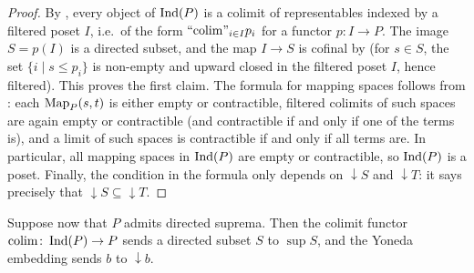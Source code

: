 	\begin{proof}
		By , every object of $\operatorname{Ind}(P)$ is a colimit of representables indexed by a filtered poset $I$, i.e.\ of the form $\text{``}\!\operatorname{colim}\!\text{''}_{i \in I} p_i$ for a functor $p\colon I \to P$. The image $S = p(I)$ is a directed subset, and the map $I \to S$ is cofinal by  (for $s \in S$, the set $\{i \mid s \leq p_i\}$ is non-empty and upward closed in the filtered poset $I$, hence filtered). This proves the first claim. The formula for mapping spaces follows from : each $\operatorname{Map}_P(s,t)$ is either empty or contractible, filtered colimits of such spaces are again empty or contractible (and contractible if and only if one of the terms is), and a limit of such spaces is contractible if and only if all terms are. In particular, all mapping spaces in $\operatorname{Ind}(P)$ are empty or contractible, so $\operatorname{Ind}(P)$ is a poset. Finally, the condition in the formula only depends on ${\downarrow}S$ and ${\downarrow}T$: it says precisely that ${\downarrow}S \subseteq {\downarrow}T$.
	\end{proof}

	Suppose now that $P$ admits directed suprema. Then the colimit functor $\operatorname{colim}\colon \operatorname{Ind}(P) \to P$ sends a directed subset $S$ to $\sup S$, and the Yoneda embedding sends $b$ to ${\downarrow}b$.

